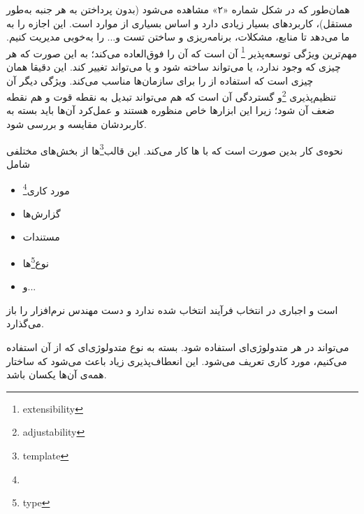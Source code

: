 همان‌طور که در شکل شماره «۲» مشاهده ‌می‌شود (بدون پرداختن به هر جنبه به‌طور مستقل)،  کاربردهای بسیار زیادی دارد و اساس بسیاری از موارد است. این اجازه را به ما می‌دهد تا منابع، مشکلات، برنامه‌ریزی و ساختن تست و... را به‌خوبی مدیریت کنیم. مهم‌ترین ویژگی  توسعه‌پذیر \footnote{extensibility} آن است که آن را فوق‌العاده می‌کند؛ به این صورت که هر چیزی که وجود ندارد، یا می‌تواند ساخته شود و یا می‌تواند تغییر کند. این دقیقا همان چیزی است که استفاده از  را برای سازمان‌ها مناسب می‌کند. ویژگی دیگر آن تنظیم‌پذیری \footnote{adjustability}و گستردگی آن است که هم می‌تواند تبدیل به نقطه قوت و هم نقطه ضعف آن شود؛ زیرا این ابزارها خاص منظوره هستند و عمل‌کرد آن‌ها باید بسته به کاربردشان  مقایسه و بررسی شود.


نحوه‌ی کار  بدین صورت است که با ها کار می‌کند. این قالب‌\footnote{template}ها از بخش‌های مختلفی شامل 
\begin{itemize}
	\item مورد کاری\footnote{}
	\item گزارش‌ها
	\item مستندات
	\item نوع\footnote{type}‌ها
	\item و...
\end{itemize}
است و اجباری در انتخاب فرآیند انتخاب شده ندارد و دست مهندس نرم‌افزار را باز می‌گذارد.

 می‌تواند در هر متدولوژی‌ای استفاده شود.  بسته به نوع متدولوژی‌ای که از آن استفاده می‌کنیم، مورد کاری تعریف می‌شود. این انعطاف‌پذیری زیاد باعث می‌شود که ساختار همه‌ی آن‌ها یکسان باشد.